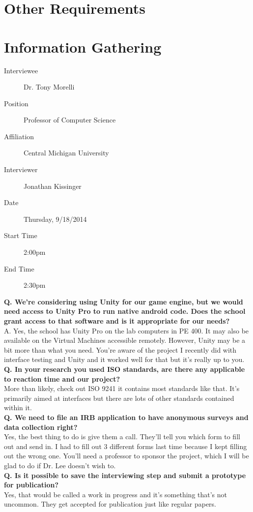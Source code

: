 \documentclass[a4wide]{article}
\begin{document}

\section{Other Requirements}
\newpage
\appendix
\appendixpage

\section{Information Gathering}

\begin{description}
\item[Interviewee] Dr. Tony Morelli
\item[Position] Professor of Computer Science
\item[Affiliation] Central Michigan University
\item[Interviewer] Jonathan Kissinger
\item[Date] Thursday, 9/18/2014
\item[Start Time] 2:00pm
\item[End Time] 2:30pm
\end{description}
\textbf{Q. We're considering using Unity for our game engine, but we would need
access to Unity Pro to run native android code.  Does the school grant access to
that software and is it appropriate for our needs?}\\
A. Yes, the school has Unity Pro on the lab computers in PE 400.  It may also be
available on the Virtual Machines accessible remotely.  However, Unity may be a
bit more than what you need.  You're aware of the project I recently did with
interface testing and Unity and it worked well for that but it's really up to
you.\vspace{2.0 mm}\\
\textbf{Q. In your research you used ISO standards, are there any applicable to
reaction time and our project?}\\
More than likely, check out ISO 9241 it contains most standards like that.  It's
primarily aimed at interfaces but there are lots of other standards contained
within it.\vspace{2.0 mm}\\
\textbf{Q. We need to file an IRB application to have anonymous surveys and data
collection right?}\\
Yes, the best thing to do is give them a call.  They'll tell you which form to
fill out and send in.  I had to fill out 3 different forms last time because I
kept filling out the wrong one.  You'll need a professor to sponsor the project,
which I will be glad to do if Dr. Lee doesn't wish to.\vspace{2.0 mm}\\
\textbf{Q. Is it possible to save the interviewing step and submit a prototype
for publication?}\\
Yes, that would be called a work in progress and it's something that's not
uncommon.  They get accepted for publication just like regular papers.
\end{document}
